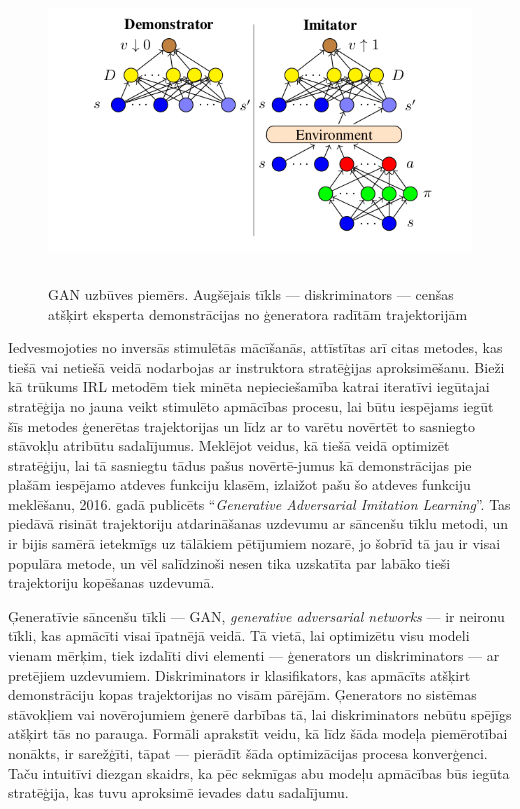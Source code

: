 \documentclass[12pt, a4paper]{article}
\numberwithin{equation}{section} %
\begin{document}
\begin{figure}[h!]
    \centering
    \includegraphics[height=8cm,page=1]{../img/GAN.png}
    \caption{GAN uzbūves piemērs. Augšējais tīkls --- diskriminators --- cenšas atšķirt eksperta demonstrācijas no ģeneratora radītām trajektorijām\cite{torabi2018generative}}
\end{figure}

Iedvesmojoties no inversās stimulētās mācīšanās, attīstītas arī citas metodes, kas tiešā vai netiešā veidā nodarbojas ar instruktora stratēģijas aproksimēšanu. Bieži kā trūkums IRL metodēm tiek minēta nepieciešamība katrai iteratīvi iegūtajai stratēģija no jauna veikt stimulēto apmācības procesu, lai būtu iespējams iegūt šīs metodes ģenerētas trajektorijas un līdz ar to varētu novērtēt to sasniegto stāvokļu atribūtu sadalījumus. Meklējot veidus, kā tiešā veidā optimizēt stratēģiju, lai tā sasniegtu tādus pašus novērtē-jumus kā demonstrācijas pie plašām iespējamo atdeves funkciju klasēm, izlaižot pašu šo atdeves funkciju meklēšanu, 2016. gadā publicēts ``\textit{Generative Adversarial Imitation Learning}''\cite{ho2016generative}. Tas piedāvā risināt trajektoriju atdarināšanas uzdevumu ar sāncenšu tīklu metodi, un ir bijis samērā ietekmīgs uz tālākiem pētījumiem nozarē, jo šobrīd tā jau ir visai populāra metode, un vēl salīdzinoši nesen tika uzskatīta par labāko tieši trajektoriju kopēšanas uzdevumā\cite{torabi2018generative}.


Ģeneratīvie sāncenšu tīkli --- GAN, \textit{generative adversarial networks} --- ir neironu tīkli, kas apmācīti visai īpatnējā veidā. Tā vietā, lai optimizētu visu modeli vienam mērķim, tiek izdalīti divi elementi --- ģenerators un diskriminators --- ar pretējiem uzdevumiem. Diskriminators ir klasifikators, kas apmācīts atšķirt demonstrāciju kopas trajektorijas no visām pārējām. Ģenerators no sistēmas stāvokļiem vai novērojumiem ģenerē darbības tā, lai diskriminators nebūtu spējīgs atšķirt tās no parauga. Formāli aprakstīt veidu, kā līdz šāda modeļa piemērotībai nonākts, ir sarežģīti, tāpat --- pierādīt šāda optimizācijas procesa konverģenci. Taču intuitīvi diezgan skaidrs, ka pēc sekmīgas abu modeļu apmācības būs iegūta stratēģija, kas tuvu aproksimē ievades datu sadalījumu.
\end{document}

